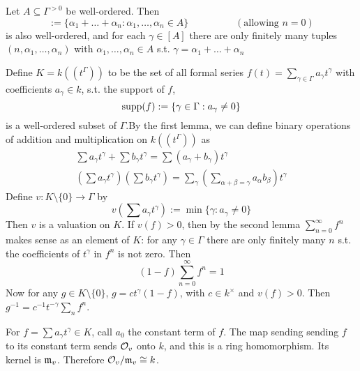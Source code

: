 \documentclass[11pt]{article}
\begin{document}
\begin{lemma}
Let \(A\subseteq\Gamma^{>0}\) be well-ordered. Then
\begin{equation*}
[A]:=\{\alpha_1+\dots+\alpha_n:\alpha_1,\dots,\alpha_n\in A\}\hspace{2cm}(\text{allowing }n=0)
\end{equation*}
is also well-ordered, and for each \(\gamma\in[A]\) there are only finitely many
tuples \((n,\alpha_1,\dots,\alpha_n)\) with \(\alpha_1,\dots,\alpha_n\in A\) s.t. \(\gamma=\alpha_1+\dots+\alpha_n\)
\end{lemma}

Define \(K=k((t^\Gamma))\) to be the set of all formal series \(f(t)=\sum_{\gamma\in\Gamma}a_\gamma t^\gamma\) with
coefficients \(a_\gamma\in k\), s.t. the support of \(f\),
\begin{equation*}
\operatorname{supp}(f)    :=\{\gamma\in\Gamma:a_\gamma\neq 0\}
\end{equation*}
is a well-ordered subset of \(\Gamma\).By the first lemma, we can define binary operations of addition
and multiplication on \(k((t^\Gamma))\) as
\begin{gather*}
\sum a_\gamma t^\gamma+\sum b_\gamma t^\gamma=\sum(a_\gamma+b_\gamma)t^\gamma\\
\left( \sum a_\gamma t^\gamma \right)\left( \sum b_\gamma t^\gamma \right)=
\sum_\gamma\left( \sum_{\alpha+\beta=\gamma}a_\alpha b_\beta \right)t^\gamma
\end{gather*}
Define \(v:K\setminus\{0\}\to\Gamma\) by
\begin{equation*}
v(\sum a_\gamma t^\gamma):=\min\{\gamma:a_\gamma\neq 0\}
\end{equation*}
Then \(v\) is a valuation on \(K\). If \(v(f)>0\), then by the second lemma \(\sum_{n=0}^\infty f^n\)
makes sense as an element of \(K\): for any \(\gamma\in\Gamma\) there are only finitely many \(n\) s.t. the
coefficients of \(t^\gamma\) in \(f^n\) is not zero. Then
\begin{equation*}
(1-f)\sum_{n=0}^\infty f^n=1
\end{equation*}
Now for any \(g\in K\setminus\{0\}\), \(g=ct^\gamma(1-f)\), with \(c\in k^\times\) and \(v(f)>0\).
Then \(g^{-1}=c^{-1}t^{-\gamma}\sum_nf^n\).

For \(f=\sum a_\gamma t^\gamma\in K\), call \(a_0\) the constant term of \(f\). The map sending sending \(f\) to
its constant term sends \(\mathcal{O}_v\) onto \(k\), and this is a ring homomorphism. Its kernel
is \(\mathfrak{m}_v\). Therefore \(\mathcal{O}_v/\mathfrak{m}_v\cong k\).
\end{document}

